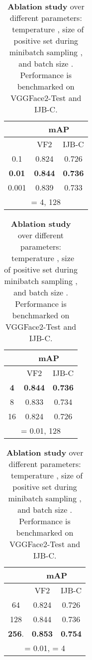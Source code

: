\documentclass[runningheads]{llncs}
\begin{document}
\setlength{\tabcolsep}{4pt}
\begin{table}[t]
\caption{\small{{\bf Ablation study} over different parameters: ~temperature , size of positive set during minibatch sampling , and batch size . 
Performance is benchmarked on VGGFace2-Test and IJB-C.}}       
\label{ablation_table}
\centering
            \footnotesize
                    \begin{tabular}{c|cc}
                        \hline
                         & \multicolumn{2}{c}{mAP} \\ \hline
                        
\multicolumn{1}{c|}{} &  \multicolumn{1}{c}{VF2} & \multicolumn{1}{c}{IJB-C} \\ \hline
                        0.1                 &  0.824 & 0.726  \\
                        \textbf{0.01}            & \textbf{0.844} & \textbf{0.736}   \\
                        0.001                  & 0.839 & 0.733  \\ \hline
                        \multicolumn{3}{c}{\small{ = 4,  128}} 
                    \end{tabular}
                \hfill
                \begin{tabular}{c|cc}
                        \hline
                         & \multicolumn{2}{c}{mAP}  \\ \hline
                        \multicolumn{1}{c|}{} &  \multicolumn{1}{c}{VF2} & \multicolumn{1}{c}{IJB-C} \\ \hline
                        \textbf{4}                 &  \textbf{0.844} & \textbf{0.736}  \\
                        8                & 0.833 & 0.734   \\
                        16                  & 0.824 & 0.726  \\ \hline
                        \multicolumn{3}{c}{\small{ = 0.01,  128}}
                    \end{tabular}
                \hfill
                \begin{tabular}{c|cc}
                        \hline
                         & \multicolumn{2}{c}{mAP}  \\ \hline
                        \multicolumn{1}{c|}{} &  \multicolumn{1}{c}{VF2} & \multicolumn{1}{c}{IJB-C} \\ \hline
                        64                 &  0.824  &  0.726  \\
                        128            & 0.844 & 0.736   \\
                        \textbf{256}.  & \textbf{0.853}  & \textbf{0.754}  \\ \hline
                        \multicolumn{3}{c}{\small{ = 0.01,  = 4}}
                    \end{tabular}

\end{table}
\end{document}
